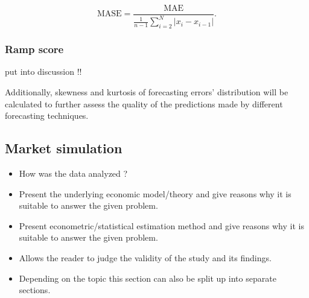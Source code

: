 \begin{equation} \label{Eq:MASE}
\text{MASE}=\frac{\text{MAE}}{\frac{1}{n-1}\sum_{i=2}^N\left|x_i-x_{i-1}\right|}.
\end{equation}


\subsubsection{Ramp score}
 put into discussion !!


Additionally, skewness and kurtosis of forecasting errors’ distribution will be calculated to further assess the quality of the predictions made by different forecasting techniques.




\subsection{Market simulation}\label{Sec:Method;Subsec:Market}




\begin{itemize}

    \item How was the data analyzed ?

    \item Present the underlying economic model/theory and
        give reasons why it is suitable to answer the given problem.

    \item Present econometric/statistical estimation method and
        give reasons why it is suitable to answer the given problem.

    \item Allows the reader to judge the validity of the study and its findings.

    \item Depending on the topic this section can also be split up into separate sections.

\end{itemize}
